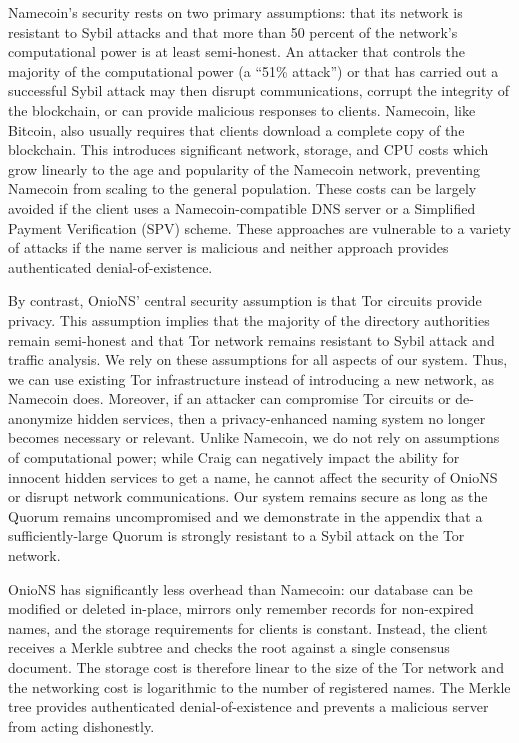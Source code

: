 \documentclass[USenglish,oneside,twocolumn]{article}
\begin{document}
Namecoin's security rests on two primary assumptions: that its network is resistant to Sybil attacks and that more than 50 percent of the network's computational power is at least semi-honest. An attacker that controls the majority of the computational power (a ``51\% attack'') or that has carried out a successful Sybil attack may then disrupt communications, corrupt the integrity of the blockchain, or can provide malicious responses to clients. Namecoin, like Bitcoin, also usually requires that clients download a complete copy of the blockchain. This introduces significant network, storage, and CPU costs which grow linearly to the age and popularity of the Namecoin network, preventing Namecoin from scaling to the general population. These costs can be largely avoided if the client uses a Namecoin-compatible DNS server or a Simplified Payment Verification \cite{nakamoto2008bitcoin} (SPV) scheme. These approaches are vulnerable to a variety of attacks if the name server is malicious and neither approach provides authenticated denial-of-existence.

By contrast, OnioNS' central security assumption is that Tor circuits provide privacy. This assumption implies that the majority of the directory authorities remain semi-honest and that Tor network remains resistant to Sybil attack and traffic analysis. We rely on these assumptions for all aspects of our system. Thus, we can use existing Tor infrastructure instead of introducing a new network, as Namecoin does. Moreover, if an attacker can compromise Tor circuits or de-anonymize hidden services, then a privacy-enhanced naming system no longer becomes necessary or relevant. Unlike Namecoin, we do not rely on assumptions of computational power; while Craig can negatively impact the ability for innocent hidden services to get a name, he cannot affect the security of OnioNS or disrupt network communications. Our system remains secure as long as the Quorum remains uncompromised and we demonstrate in the appendix that a sufficiently-large Quorum is strongly resistant to a Sybil attack on the Tor network.

OnioNS has significantly less overhead than Namecoin: our database can be modified or deleted in-place, mirrors only remember records for non-expired names, and the storage requirements for clients is constant. Instead, the client receives a Merkle subtree and checks the root against a single consensus document. The storage cost is therefore linear to the size of the Tor network and the networking cost is logarithmic to the number of registered names. The Merkle tree provides authenticated denial-of-existence and prevents a malicious server from acting dishonestly.
\end{document}

